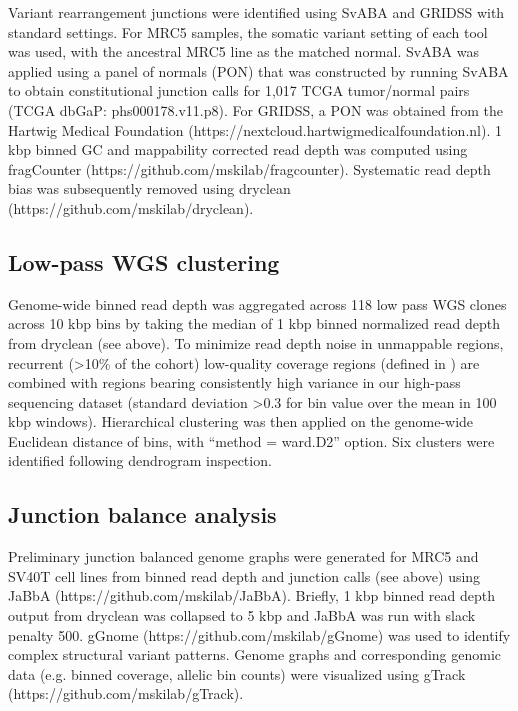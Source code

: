 \documentclass[phd,tocprelim]{cornell}
\begin{document}
Variant rearrangement junctions were identified using SvABA \cite{wala2018} and GRIDSS \cite{Cameron2017-pz} with standard settings. For MRC5 samples, the somatic variant setting of each tool was used, with the ancestral MRC5 line as the matched normal.  SvABA was applied using a panel of normals (PON) that was constructed by running SvABA to obtain constitutional junction calls for 1,017 TCGA tumor/normal pairs (TCGA dbGaP: phs000178.v11.p8).  For GRIDSS, a PON was obtained from the Hartwig Medical Foundation (https://nextcloud.hartwigmedicalfoundation.nl). 1 kbp binned GC and mappability corrected read depth was computed using fragCounter (https://github.com/mskilab/fragcounter). Systematic read depth bias was subsequently removed using dryclean (https://github.com/mskilab/dryclean).

\subsection*{Low-pass WGS clustering}
Genome-wide binned read depth was aggregated across 118 low pass WGS clones across 10 kbp bins by taking the median of 1 kbp binned normalized read depth from dryclean (see above). To minimize read depth noise in unmappable regions, recurrent (>10\% of the cohort) low-quality coverage regions (defined in \cite{Hadi2020-um}) are combined with regions bearing consistently high variance in our high-pass sequencing dataset (standard deviation >0.3 for bin value over the mean in 100 kbp windows). Hierarchical clustering was then applied on the genome-wide Euclidean distance of bins, with “method = ward.D2” option. Six clusters were identified following dendrogram inspection.  

\subsection*{Junction balance analysis}
Preliminary junction balanced genome graphs were generated for MRC5 and SV40T cell lines from binned read depth and junction calls (see above) using JaBbA (https://github.com/mskilab/JaBbA)\cite{Hadi2020-um}. Briefly, 1 kbp binned read depth output from dryclean was collapsed to 5 kbp and JaBbA was run with slack penalty 500. gGnome (https://github.com/mskilab/gGnome) was used to identify complex structural variant patterns. Genome graphs and corresponding genomic data (e.g. binned coverage, allelic bin counts) were visualized using gTrack (https://github.com/mskilab/gTrack). 
\end{document}

